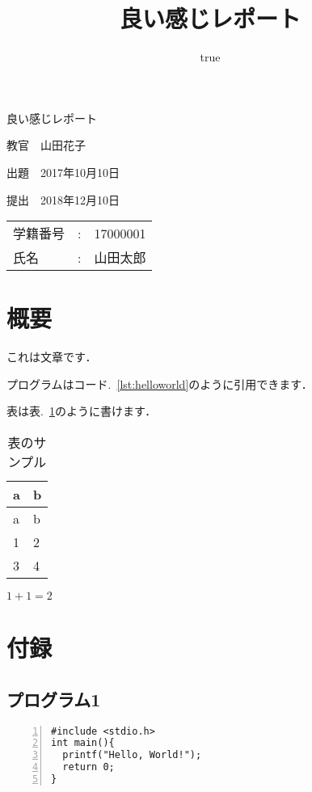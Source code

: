 \documentclass[]{ltjsarticle}
\title{良い感じレポート}
\author{true}
\date{}
\begin{document}
  \begin{center}
          {\LARGE 良い感じレポート}\vspace{5mm}
    
                  {\large 教官\ \ 山田花子}\vspace{5mm}
      
      
      
          
              {\large 出題\ \ 2017年10月10日}\vspace{5mm}
      
      
          
      
              {\large 提出\ \ 2018年12月10日}\vspace{5mm}
      
        
  {\LARGE
     \begin{tabular}{lcl}
                  学籍番号&:& {17000001}\\
          氏名    &:& {山田太郎}
             \end{tabular}
  }
  \end{center}
\thispagestyle{empty}
\newpage
\setcounter{page}{1}

\section{概要}\label{ux6982ux8981}

これは文章です．

プログラムはコード.~\ref{lst:helloworld}のように引用できます．

表は表.~\ref{tbl:sample}のように書けます．

\hypertarget{tbl:sample}{}
\begin{longtable}[]{@{}ll@{}}
\caption{\label{tbl:sample}表のサンプル }\tabularnewline
\toprule
a & b\tabularnewline
\midrule
\endfirsthead
\toprule
a & b\tabularnewline
\midrule
\endhead
1 & 2\tabularnewline
3 & 4\tabularnewline
\bottomrule
\end{longtable}

\(1 + 1 = 2\)

\section{付録}\label{ux4ed8ux9332}

\subsection{プログラム1}\label{ux30d7ux30edux30b0ux30e9ux30e01}

\begin{lstlisting}[numbers=left, label={lst:helloworld}, caption={Caption..}, style=customc]
#include <stdio.h>
int main(){
  printf("Hello, World!");
  return 0;
}
\end{lstlisting}
\end{document}
